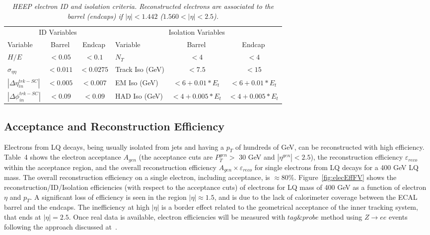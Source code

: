 \begin{table}[htbp]
  \label{tab:HEEPselection}
  \begin{center}
    \begin{tabular}{|lcc|lcc|} \hline
      \multicolumn{3}{|c|}{ID Variables} & \multicolumn{3}{|c|}{Isolation Variables} \\ 
      Variable & Barrel & Endcap & Variable & Barrel & Endcap  \\ \hline
      $H/E$  & $<0.05$ & $<0.1$ & $N_T$  & $<4$ & $<4$ \\ \hline
      $\sigma_{\eta\eta}$  & $<0.011$ & $<0.0275$ & Track Iso (GeV) & $<7.5$ & $<15$ \\ \hline
      $|\Delta\eta_{in}^{trk-SC}|$ & $<0.005$ & $<0.007$ & EM Iso (GeV) & $<6+0.01*E_{t}$ & $<6+0.01*E_{t}$ \\ \hline
      $|\Delta\phi_{in}^{trk-SC}|$ & $<0.09$ & $<0.09$ & HAD Iso (GeV) & $<4+0.005*E_{t}$ & $<4+0.005*E_{t}$ \\ \hline
    \end{tabular}
  \caption{\small \sl HEEP electron ID and isolation criteria. Reconstructed electrons are associated to the 
    barrel (endcaps) if $|\eta|<1.442$ ($1.560<|\eta|<2.5$).}
  \end{center}
\end{table}


\subsection{Acceptance and Reconstruction Efficiency} \label{sec:electronEfficiency}

Electrons from LQ decays, being usually isolated from jets and having a $p_{T}$ of 
hundreds of GeV, can be reconstructed with high efficiency. 
Table~4
shows the electron acceptance $A_{gen}$ (the acceptance cuts are $P_{T}^{gen}>$ 30 GeV 
and $|\eta^{gen}|<2.5$), the reconstruction efficiency $\varepsilon_{reco}$ within the acceptance 
region, and the overall reconstruction efficiency $A_{gen} \times \varepsilon_{reco}$ 
for single electrons from LQ decays for a 400 GeV LQ mass.
The overall reconstruction efficiency on a single electron, including acceptance, is $\approx 80\%$.
Figure~\ref{fig:elecEffFV} shows the reconstruction/ID/Isolation efficiencies
(with respect to the acceptance cuts) of electrons for LQ mass of 400 GeV as a function of electron $\eta$ and $p_{T}$. 
A significant loss of efficiency is seen in the region $|\eta| \approx 1.5$, 
and is due to the lack of calorimeter coverage between the ECAL barrel and the endcaps. 
The inefficiency at high $|\eta|$ is a border effect related to the 
geometrical acceptance of the inner tracking system, that ends at $|\eta| = 2.5$.
Once real data is available, electron efficiencies will be measured 
with $tag\&probe$ method using $Z \rightarrow ee$ events 
following the approach discussed at~\cite{TagAndProbe}. \\

